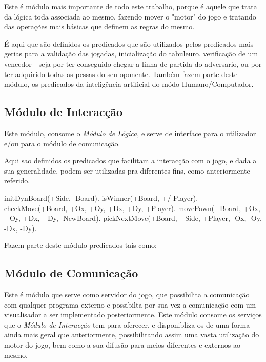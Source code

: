 \documentclass[15pt,a4paper]{article}
\begin{document}
Este é módulo mais importante de todo este trabalho, porque é aquele que trata da lógica toda associada ao mesmo, fazendo mover o "motor" do jogo e tratando das
operações mais básicas que definem as regras do mesmo.

É aqui que são definidos os predicados que são utilizados pelos predicados mais gerias para a validação das jogadas, inicialização do tabuleuro, verificação de um vencedor - seja por ter conseguido chegar a linha de partida do adversario, ou por ter adquirido todas as pessas do seu oponente. Também fazem parte deste módulo, os predicados da inteligência artificial do módo Humano/Computador.



\subsection{Módulo de Interacção}

Este módulo, consome o \textit{Módulo de Lógica}, e serve de interface para o utilizador e/ou para o módulo de comunicação.

Aqui sao definidos os predicados que facilitam a interacção com o jogo, e dada a sua generalidade, podem ser utilizadas pra diferentes fins, como anteriormente referido.

\begin{code}[H]
	\begin{verbatimtab} %


initDynBoard(+Side, -Board).
isWinner(+Board, +/-Player).
checkMove(+Board, +Ox, +Oy, +Dx, +Dy, +Player).
movePawn(+Board, +Ox, +Oy, +Dx, +Dy, -NewBoard).
pickNextMove(+Board, +Side, +Player, -Ox, -Oy, -Dx, -Dy).
\end{verbatimtab}
\caption{Fazem parte deste módulo predicados tais como:}
\end{code}


\subsection{Módulo de Comunicação}

Este é módulo que serve como servidor do jogo, que possibilita a comunicação com qualquer programa externo e possibilta por sua vez a
comunicação com um visualisador a ser implementado posteriormente.
Este módulo consome os serviços que o \textit{Módulo de Interacção} tem para oferecer, e disponibliza-os de uma forma ainda mais geral que anteriormente, possibilitando
assim uma vasta utilização do motor do jogo, bem como a sua difusão para meios diferentes e externos ao mesmo.
\end{document}
